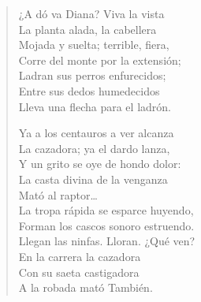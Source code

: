 \documentclass[12pt]{article}
\begin{document}
\begin{verse}
¿A dó va Diana? Viva la vista\\
La planta alada, la cabellera\\
Mojada y suelta; terrible, fiera,\\
Corre del monte por la extensión;\\
Ladran sus perros enfurecidos;\\
Entre sus dedos humedecidos\\
Lleva una flecha para el ladrón.  

Ya a los centauros a ver alcanza\\
La cazadora; ya el dardo lanza,\\
Y un grito se oye de hondo dolor:\\
La casta divina de la venganza\\
Mató al raptor\ldots{}\\
La tropa rápida se esparce huyendo,\\
Forman los cascos sonoro estruendo.\\
Llegan las ninfas. Lloran. ¿Qué ven?\\
En la carrera la cazadora\\
Con su saeta castigadora\\
A la robada mató También.  

\end{verse}
\end{document}

